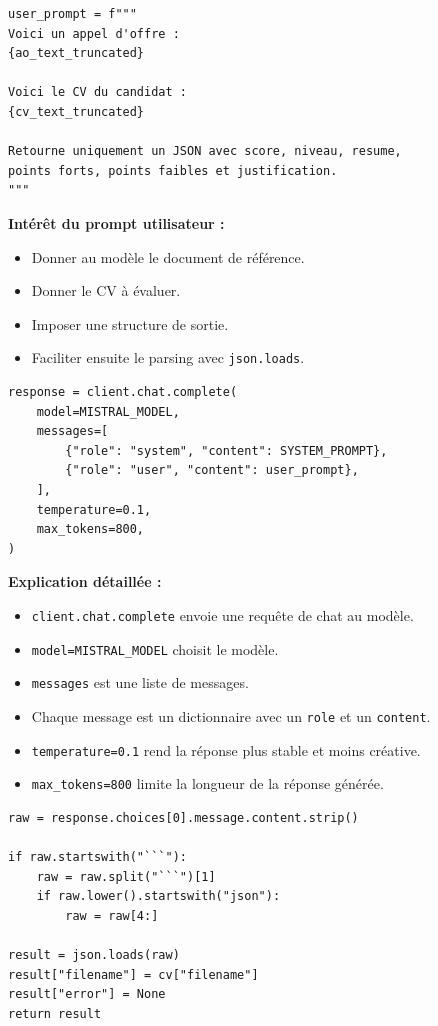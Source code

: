 \documentclass[12pt,a4paper]{article}
\begin{document}
\begin{lstlisting}[style=pythonstyle]
user_prompt = f"""
Voici un appel d'offre :
{ao_text_truncated}

Voici le CV du candidat :
{cv_text_truncated}

Retourne uniquement un JSON avec score, niveau, resume,
points forts, points faibles et justification.
"""
\end{lstlisting}

\textbf{Intérêt du prompt utilisateur :}
\begin{itemize}
  \item Donner au modèle le document de référence.
  \item Donner le CV à évaluer.
  \item Imposer une structure de sortie.
  \item Faciliter ensuite le parsing avec \texttt{json.loads}.
\end{itemize}

\begin{lstlisting}[style=pythonstyle]
response = client.chat.complete(
    model=MISTRAL_MODEL,
    messages=[
        {"role": "system", "content": SYSTEM_PROMPT},
        {"role": "user", "content": user_prompt},
    ],
    temperature=0.1,
    max_tokens=800,
)
\end{lstlisting}

\textbf{Explication détaillée :}
\begin{itemize}
  \item \texttt{client.chat.complete} envoie une requête de chat au modèle.
  \item \texttt{model=MISTRAL\_MODEL} choisit le modèle.
  \item \texttt{messages} est une liste de messages.
  \item Chaque message est un dictionnaire avec un \texttt{role} et un \texttt{content}.
  \item \texttt{temperature=0.1} rend la réponse plus stable et moins créative.
  \item \texttt{max\_tokens=800} limite la longueur de la réponse générée.
\end{itemize}

\begin{lstlisting}[style=pythonstyle]
raw = response.choices[0].message.content.strip()

if raw.startswith("```"):
    raw = raw.split("```")[1]
    if raw.lower().startswith("json"):
        raw = raw[4:]

result = json.loads(raw)
result["filename"] = cv["filename"]
result["error"] = None
return result
\end{lstlisting}
\end{document}
